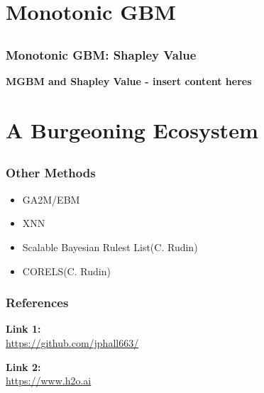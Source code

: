 \documentclass[11pt,aspectratio=169,hyperref={colorlinks}]{beamer}
\begin{document}
	\section{Monotonic GBM}

	\subsection*{}
	
	\begin{frame}
	
		\frametitle{Monotonic GBM: Shapley Value}
		
		\textbf{MGBM and Shapley Value - insert content heres}
		
	\end{frame}


	\section{A Burgeoning Ecosystem}
			
		\subsection*{}
		
		\begin{frame}
		
			\frametitle{Other Methods}		
			
			\begin{itemize}
				\item{GA2M/EBM}
				\item{XNN}
				\item{Scalable Bayesian Rulest List(C. Rudin)}
				\item{CORELS(C. Rudin)}
			\end{itemize}
		
		\end{frame}
		
		

	\begin{frame}[t, allowframebreaks]
	
		\frametitle{References}	
		
			\textbf{Link 1:}\\
			\small{\url{https://github.com/jphall663/}}
			
			\vspace{10pt}
			
			\textbf{Link 2:}\\
			\small{\url{https://www.h2o.ai}}
			
		\framebreak		
		
		\printbibliography
		
	\end{frame}
\end{document}
